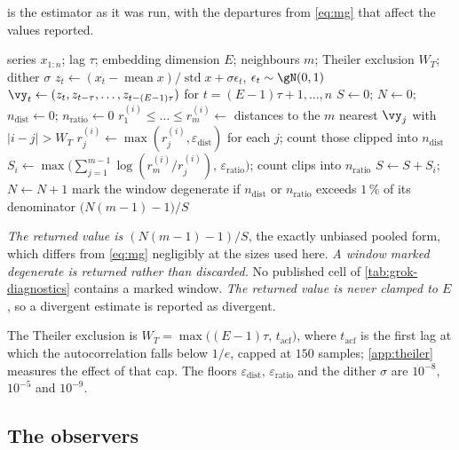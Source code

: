 \documentclass[twoside]{article}
\begin{document}
 is the estimator as it was run, with the departures from \cref{eq:mg} that affect
the values reported.

\begin{algorithm}[H]
\caption{Pooled Levina--Bickel intrinsic dimension of a delay reconstruction}
\label{alg:mg}
\begin{algorithmic}[1]
\Require series $x_{1:n}$; lag $\tau$; embedding dimension $E$; neighbours $m$; Theiler
exclusion $W_T$; dither $\sigma$
\State $z_t \gets (x_t - \operatorname{mean} x) / \operatorname{std} x + \sigma \epsilon_t$,\quad
       $\epsilon_t \sim \gN(0,1)$ 
\State $\vy_t \gets (z_t, z_{t-\tau}, \dots, z_{t-(E-1)\tau})$ for $t = (E-1)\tau+1, \dots, n$
\State $S \gets 0$; $N \gets 0$; $n_{\mathrm{dist}} \gets 0$; $n_{\mathrm{ratio}} \gets 0$
  \State $r^{(i)}_1 \le \dots \le r^{(i)}_m \gets$ distances to the $m$ nearest $\vy_j$
         with $|i-j| > W_T$
  \State $r^{(i)}_j \gets \max(r^{(i)}_j, \varepsilon_{\mathrm{dist}})$ for each $j$; count those
         clipped into $n_{\mathrm{dist}}$
  \State $S_i \gets \max\bigl(\sum_{j=1}^{m-1} \log(r^{(i)}_m / r^{(i)}_j),\,
         \varepsilon_{\mathrm{ratio}}\bigr)$; count clips into $n_{\mathrm{ratio}}$
  \State $S \gets S + S_i$; \quad $N \gets N + 1$
\EndFor
\State mark the window degenerate if $n_{\mathrm{dist}}$ or $n_{\mathrm{ratio}}$ exceeds
       $1\,\%$ of its denominator
\State \Return $\bigl(N(m-1) - 1\bigr) / S$
\end{algorithmic}
\end{algorithm}

\emph{The returned value is $(N(m-1)-1)/S$}, the exactly unbiased pooled form, which differs from
\cref{eq:mg} negligibly at the sizes used here. \emph{A window marked degenerate is
returned rather than discarded.} No published cell of \cref{tab:grok-diagnostics} contains a marked
window. \emph{The returned value is never clamped to $E$}, so a divergent estimate is reported as
divergent.

The Theiler exclusion is $W_T = \max\bigl((E-1)\tau,\, t_{\mathrm{acf}}\bigr)$, where
$t_{\mathrm{acf}}$ is the first lag at which the autocorrelation falls below $1/e$, capped at $150$
samples; \cref{app:theiler} measures the effect of that cap. The floors $\varepsilon_{\mathrm{dist}}$, $\varepsilon_{\mathrm{ratio}}$ and
the dither $\sigma$ are $10^{-8}$, $10^{-5}$ and $10^{-9}$.

\subsection{The observers}\label{app:obs}
\end{document}
